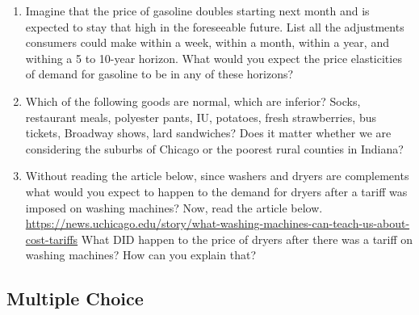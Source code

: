 \documentclass[
]{book}
\providecommand{\tightlist}{%
  \setlength{\itemsep}{0pt}\setlength{\parskip}{0pt}}
\begin{document}
\begin{enumerate}
\def\labelenumi{\arabic{enumi}.}
\tightlist
\item
  Imagine that the price of gasoline doubles starting next month and is expected to stay that high in the foreseeable future. List all the adjustments consumers could make within a week, within a month, within a year, and withing a 5 to 10-year horizon. What would you expect the price elasticities of demand for gasoline to be in any of these horizons?\\
\item
  Which of the following goods are normal, which are inferior?
  Socks, restaurant meals, polyester pants, IU, potatoes, fresh strawberries, bus tickets, Broadway shows, lard sandwiches?
  Does it matter whether we are considering the suburbs of Chicago or the poorest rural counties in Indiana?
\item
  Without reading the article below, since washers and dryers are complements what would you expect to happen to the demand for dryers after a tariff was imposed on washing machines? Now, read the article below. \url{https://news.uchicago.edu/story/what-washing-machines-can-teach-us-about-cost-tariffs} What DID happen to the price of dryers after there was a tariff on washing machines? How can you explain that?
\end{enumerate}

\hypertarget{multiple-choice-3}{%
\subsection{Multiple Choice}\label{multiple-choice-3}}
\end{document}
